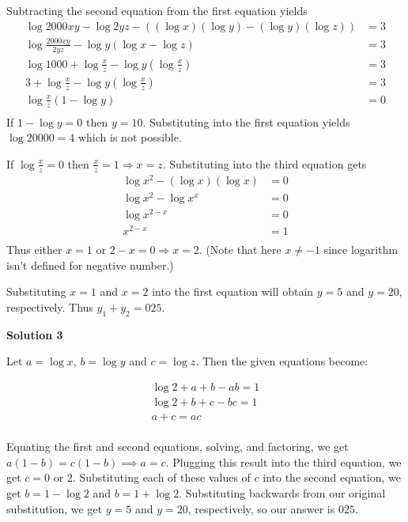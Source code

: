 \begin{enumerate}
Subtracting the second equation from the first equation yields
 \begin{align*} \log 2000xy-\log 2yz-((\log x)(\log y)-(\log y)(\log z)) &= 3 \\ \log\frac{2000xy}{2yz}-\log y(\log x-\log z) &= 3 \\ \log1000+\log\frac{x}{z}-\log y(\log\frac{x}{z}) &= 3 \\ 3+\log\frac{x}{z}-\log y(\log\frac{x}{z}) &= 3 \\ \log\frac{x}{z}(1-\log y) &= 0 \\ \end{align*}
If $1-\log y=0$ then $y=10$. Substituting into the first equation yields $\log20000=4$ which is not possible.

 If $\log\frac{x}{z}=0$ then $\frac{x}{z}=1\Longrightarrow x=z$. Substituting into the third equation gets
 \begin{align*} \log x^2-(\log x)(\log x) &= 0 \\ \log x^2-\log x^x &= 0 \\ \log x^{2-x} &= 0 \\ x^{2-x} &= 1 \\ \end{align*}
Thus either $x=1$ or $2-x=0\Longrightarrow x=2$. (Note that here $x\neq-1$ since logarithm isn't defined for negative number.)

 Substituting $x=1$ and $x=2$ into the first equation will obtain $y=5$ and $y=20$, respectively. Thus $y_1+y_2=\boxed{025}$.

 



\textbf{Solution 3}

Let $a = \log x$, $b = \log y$ and $c = \log z$. Then the given equations become: 

 
 \begin{align*} \log 2 + a + b - ab = 1 \\ \log 2 + b + c - bc = 1 \\ a+c = ac \\ \end{align*}


 Equating the first and second equations, solving, and factoring, we get $a(1-b) = c(1-b) \implies{a = c}$. Plugging this result into the third equation, we get $c = 0$ or $2$. Substituting each of these values of $c$ into the second equation, we get $b = 1 - \log 2$ and $b = 1 + \log 2$. Substituting backwards from our original substitution, we get $y = 5$ and $y = 20$, respectively, so our answer is $\boxed{025}$.


\end{enumerate}
